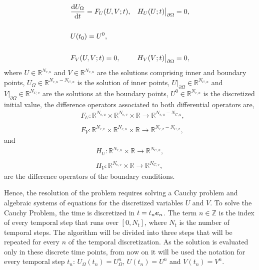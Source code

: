        \begin{align*}
       & \dv{{U}_{\Omega}}{t} = {F}_U({U},V;t),  & {H}_U({U};t)\big\rvert_{\partial \Omega}=0,\\ \\
       & {U}(t_0)={U}^0 , \\  \\
       & {F}_V({U},V;t)=0, & {H}_V({V};t)\big\rvert_{\partial \Omega}=0, 
       \end{align*}
where $U \in \mathbb{ R}^{N_{e,u}}$ and $V \in \mathbb{ R}^{N_{e,u}}$ are the solutions comprising inner and boundary points, $U_{\Omega}\in \mathbb{ R}^{N_{e,u}-N_{C,u}}$ is the solution of inner points, $U \big\rvert_{\partial \Omega} \in \mathbb{ R}^{N_{C,u}}$ and $V \big\rvert_{\partial \Omega} \in \mathbb{ R}^{N_{C,v}}$ are the solutions at the  boundary points, $U^0 \in \mathbb{ R}^{N_{e,u}}$ is the discretized initial value, the difference operators associated to both differential operators are, 
       \begin{align*}
       	& {F}_U: \mathbb{ R}^{N_{e,u}} \times \mathbb{ R}^{N_{e,v}} \times \mathbb{ R}\rightarrow \mathbb{ R}^{N_{e,u}-N_{C,u}}, \\ \\
       	& {F}_V: \mathbb{ R}^{N_{e,v}} \times \mathbb{ R}^{N_{e,u}} \times \mathbb{ R}\rightarrow \mathbb{ R}^{N_{e,v}-N_{C,v}},
       \end{align*}
and   
       \begin{align*}
       {H}_U: \mathbb{ R}^{N_{e,u}} \times \mathbb{ R}\rightarrow \mathbb{ R}^{N_{C,u}}, \\ \\
        {H}_V: \mathbb{ R}^{N_{e,v}} \times \mathbb{ R}\rightarrow \mathbb{ R}^{N_{C,v}} ,
       \end{align*}
are the difference operators of the boundary conditions.       
 
 
  Hence, the resolution of the problem requires solving a Cauchy problem and algebraic systems of equations for the discretized variables $U$ and $V$.
 To solve the Cauchy Problem, the time is discretized in $t=t_n \boldsymbol{e}_n$.
 The term $n \in \mathbb{Z}$ is the index of every temporal step that runs over $[0,N_t]$, where $N_t$ is the number of temporal steps.
 The algorithm will be divided into three steps that will be repeated for every $n$ of the temporal discretization.
 As the solution is evaluated only in these discrete time points, from now on it will be used the notation for every temporal step $t_n$: $U_{\Omega}(t_n)=U^n_{\Omega}$, $U(t_n)=U^n$  and $V(t_n)=V^n$.
 
